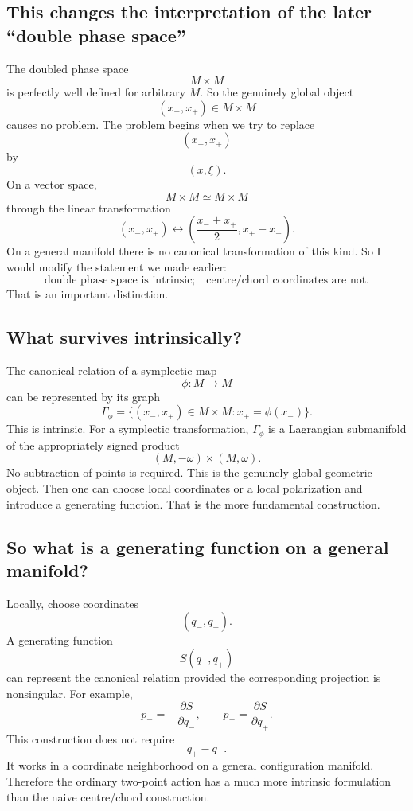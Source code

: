 \subsection{This changes the interpretation of the later “double phase space”}
The doubled phase space
$$ M\times M $$
is perfectly well defined for arbitrary \(M\).
So the genuinely global object
$$ (x_-,x_+)\in M\times M $$
causes no problem.
The problem begins when we try to replace
$$ (x_-,x_+) $$
by
$$ (x,\xi). $$
On a vector space,
$$ M\times M\simeq M\times M $$
through the linear transformation
$$ (x_-,x_+) \longleftrightarrow \left( \frac{x_-+x_+}{2},x_+-x_- \right). $$
On a general manifold there is no canonical transformation of this kind.
So I would modify the statement we made earlier:
$$ \boxed{ \text{double phase space is intrinsic;} \quad 
\text{centre/chord coordinates are not.} } $$
That is an important distinction.

\subsection{ What survives intrinsically?}
The canonical relation of a symplectic map
$$ \phi:M\rightarrow M $$
can be represented by its graph
$$ \Gamma_\phi = \{(x_-,x_+)\in M\times M: x_+=\phi(x_-)\}. $$
This is intrinsic.
For a symplectic transformation, \(\Gamma_\phi\) is a Lagrangian submanifold of
the appropriately signed product
$$ (M,-\omega)\times(M,\omega). $$
No subtraction of points is required.
This is the genuinely global geometric object.
Then one can choose local coordinates or a local polarization and introduce a
generating function.
That is the more fundamental construction.

\subsection{So what is a generating function on a general manifold?}
Locally, choose coordinates
$$ (q_-,q_+). $$
A generating function
$$ S(q_-,q_+) $$
can represent the canonical relation provided the corresponding projection is
nonsingular.
For example,
$$ p_-=-\frac{\partial S}{\partial q_-}, 
\qquad p_+=\frac{\partial S}{\partial q_+}. $$
This construction does not require
$$ q_+-q_-. $$
It works in a coordinate neighborhood on a general configuration manifold.
Therefore the ordinary two-point action has a much more intrinsic formulation
than the naive centre/chord construction.

